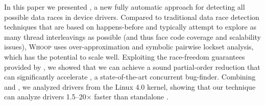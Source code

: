 In this paper we presented \whoop, a new fully automatic approach for detecting all possible data races in device drivers. Compared to traditional data race detection techniques that are based on happens-before and typically attempt to explore as many thread interleavings as possible (and thus face code coverage and scalability issues), \textsc{Whoop} uses over-approximation and symbolic pairwise lockset analysis, which has the potential to scale well. Exploiting the race-freedom guarantees provided by \whoop, we showed that we can achieve a sound partial-order reduction that can significantly accelerate \corral, a state-of-the-art concurrent bug-finder. Combining \whoop and \corral, we analyzed \sizeOfBenchmarks drivers from the Linux 4.0 kernel, showing that our technique can analyze drivers 1.5--20$\times$ faster than standalone \corral.